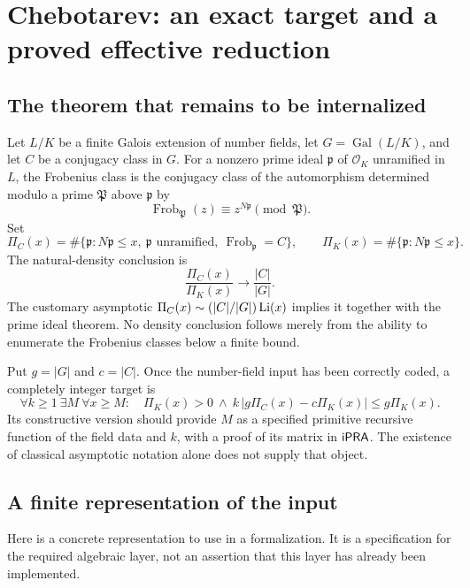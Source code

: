 \section{Chebotarev: an exact target and a proved effective reduction}
\label{sec:chebotarev}

\subsection{The theorem that remains to be internalized}

Let $L/K$ be a finite Galois extension of number fields, let
$G=\operatorname{Gal}(L/K)$, and let $C$ be a conjugacy class in $G$.
For a nonzero prime ideal $\mathfrak p$ of $\mathcal O_K$ unramified in $L$,
the Frobenius class is the conjugacy class of the automorphism determined
modulo a prime $\mathfrak P$ above $\mathfrak p$ by
\[
 \operatorname{Frob}_{\mathfrak P}(z)\equiv
 z^{N\mathfrak p}\pmod{\mathfrak P}.
\]
Set
\[
 \Pi_C(x)=\#\{\mathfrak p:N\mathfrak p\leq x,\
      \mathfrak p\text{ unramified},\ \operatorname{Frob}_{\mathfrak p}=C\},
 \qquad
 \Pi_K(x)=\#\{\mathfrak p:N\mathfrak p\leq x\}.
\]
The natural-density conclusion is
\[
 \frac{\Pi_C(x)}{\Pi_K(x)}\longrightarrow\frac{|C|}{|G|}.
\]
The customary asymptotic $\Pi_C(x)\sim(|C|/|G|)\operatorname{Li}(x)$ implies it together
with the prime ideal theorem. No density conclusion follows merely from
the ability to enumerate the Frobenius classes below a finite bound.

Put $g=|G|$ and $c=|C|$. Once the number-field input has been correctly
coded, a completely integer target is
\begin{equation}
 \forall k\geq1\ \exists M\ \forall x\geq M:
 \quad \Pi_K(x)>0\ \land\
 k\,|g\Pi_C(x)-c\Pi_K(x)|\leq g\Pi_K(x).
 \label{eq:chebotarev-integer-target}
\end{equation}
Its constructive version should provide $M$ as a specified primitive
recursive function of the field data and $k$, with a proof of its matrix
in $\mathsf{iPRA}$. The existence of classical asymptotic notation alone does not
supply that object.

\subsection{A finite representation of the input}

Here is a concrete representation to use in a formalization. It is a
specification for the required algebraic layer, not an assertion that this
layer has already been implemented.

